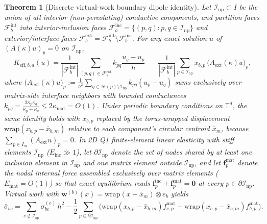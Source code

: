 \documentclass[preprint,11pt]{elsarticle}
\newcommand{\T}{\mathbb{T}}
\newcommand{\Keffij}[1]{K_{\mathrm{eff},#1}}
\newcommand{\abs}[1]{\left\lvert #1 \right\rvert}
\newtheorem{theorem}{Theorem}
\begin{document}
\begin{theorem}[Discrete virtual-work boundary dipole identity]\label{thm:dipole}
Let $\mathcal{I}_{\mathrm{np}} \subset I$ be the union of all interior (non-percolating) conductive components, and partition faces $\mathcal{F}_b^{\mathrm{int}}$ into interior-inclusion faces $\mathcal{F}_b^{\mathrm{inc}} = \{(p,q) : p,q \in \mathcal{I}_{\mathrm{np}}\}$ and exterior/interface faces $\mathcal{F}_b^{\mathrm{ext}} = \mathcal{F}_b^{\mathrm{int}} \setminus \mathcal{F}_b^{\mathrm{inc}}$. For any exact solution $u$ of $(A(\kappa)u)_p = 0$ on $\mathcal{I}_{\mathrm{np}}$,
\begin{equation}\label{eq:dipole_id}
  \Keffij{b,a}(u) = \frac{1}{\abs{\mathcal{F}_b^{\mathrm{int}}}} \sum_{(p,q) \in \mathcal{F}_b^{\mathrm{ext}}} k_{pq} \frac{u_q - u_p}{h}
  \;-\; \frac{1}{\abs{\mathcal{F}_b^{\mathrm{int}}}} \sum_{p \in \mathcal{I}_{\mathrm{np}}} x_{b,p}\, \big(A_{\mathrm{ext}}(\kappa) u\big)_p,
\end{equation}
where $\big(A_{\mathrm{ext}}(\kappa) u\big)_p := \frac{1}{h^2} \sum_{q \in \mathcal{N}(p)\setminus \mathcal{I}_{\mathrm{np}}} k_{pq}(u_p - u_q)$ sums exclusively over matrix-side interface neighbors with bounded conductances $k_{pq} = \frac{2\kappa_p\kappa_q}{\kappa_p+\kappa_q} \le 2\kappa_{\mathrm{mat}} = O(1)$. Under periodic boundary conditions on $\T^d$, the same identity holds with $x_{b,p}$ replaced by the torus-wrapped displacement $\mathrm{wrap}(x_{b,p} - \bar x_{b,m})$ relative to each component's circular centroid $\bar x_m$, because $\sum_{p\in I_m} (A_{\mathrm{ext}} u)_p = 0$. In 2D Q1 finite-element linear elasticity with stiff elements $\mathcal{I}_{\mathrm{np}}$ ($E_{\mathrm{inc}} \gg 1$), let $\partial\mathcal{I}_{\mathrm{np}}$ denote the set of nodes shared by at least one inclusion element in $\mathcal{I}_{\mathrm{np}}$ and one matrix element outside $\mathcal{I}_{\mathrm{np}}$, and let $\bm{f}^{\mathrm{mat}}_p$ denote the nodal internal force assembled exclusively over matrix elements ($E_{\mathrm{mat}} = O(1)$) so that exact equilibrium reads $\bm{f}^{\mathrm{inc}}_p + \bm{f}^{\mathrm{mat}}_p = \bm{0}$ at every $p \in \partial\mathcal{I}_{\mathrm{np}}$. Virtual work with $\bm{w}^{(b)}(x) = \mathrm{wrap}(x - \bar x_m) \otimes e_b$ yields
\begin{equation}\label{eq:elas_dipole}
  \bar\sigma_{bc} = \sum_{e \notin \mathcal{I}_{\mathrm{np}}} \sigma_{bc}^{(e)}\, h^2 - \frac{1}{2}\sum_{p \in \partial \mathcal{I}_{\mathrm{np}}} \Big( \mathrm{wrap}(x_{b,p}-\bar x_{b,m}) f^{\mathrm{mat}}_{c,p} + \mathrm{wrap}(x_{c,p}-\bar x_{c,m}) f^{\mathrm{mat}}_{b,p} \Big).
\end{equation}
\end{theorem}
\end{document}
